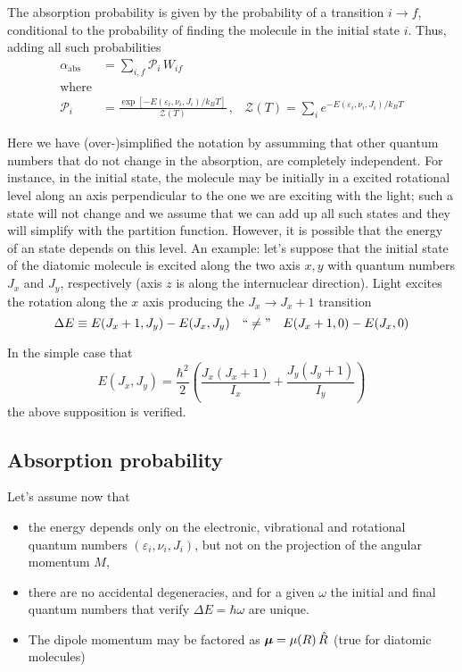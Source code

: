 The absorption probability is given by the probability of a transition $i \to f$, conditional to the probability of finding the molecule in the initial state $i$. Thus, adding all such probabilities
\begin{subequations}
  \begin{align}
    \alpha_{\text{abs}} &= \sum_{i,f} \mathcal{P}_{i}\, W_{if}
    \\ \text{where} \nonumber \\
    \mathcal{P}_{i} &= \frac{\exp{\left[-E(\varepsilon_{i},\nu_{i},J_{i})/k_{B}T \right]}}{\mathcal{Z}(T)}\,, & \mathcal{Z}(T)= \sum_{i} e^{- E(\varepsilon_{i},\nu_{i},J_{i})/k_{B}T }
  \end{align}
\end{subequations}
%
\begin{aclaracion}[Note]
  Here we have (over-)simplified the notation by assumming that other quantum numbers that do not change in the absorption, are completely independent. For instance, in the initial state, the molecule may be initially in a excited rotational level along an axis perpendicular to the one we are exciting with the light; such a state will not change and we assume that we can add up all such states and they will simplify with the partition function. However, it is possible that the energy of an state depends on this level. An example: let's suppose that the initial state of the diatomic molecule is excited along the two axis $x,y$ with quantum numbers $J_{x}$ and $J_{y}$, respectively (axis $z$ is along the internuclear direction). Light excites the rotation along the $x$ axis
  producing the $J_{x} \to J_{x} +1$ transition
  \begin{equation*}
    \Delta E \equiv E(J_{x} +1 ,J_{y}) - E(J_{x} ,J_{y}) \quad `` \neq " \quad E(J_{x} +1 ,0) - E(J_{x} ,0)
  \end{equation*}

In the simple case that 
\begin{equation*}
  E(J_{x},J_{y}) = \frac{\hbar^{2}}{2}\left( \frac{J_{x}(J_{x}+1)}{I_{x}} + \frac{J_{y}(J_{y}+1)}{I_{y}} \right)
\end{equation*}
the above supposition is verified.
\end{aclaracion}

\subsection{Absorption probability}
\label{S:absorpt-prob}

Let's assume now that
\begin{itemize}
\item the energy depends only on the electronic, vibrational and rotational quantum
  numbers $(\varepsilon_{i},\nu_{i},J_{i})$, but not on the projection of the angular
  momentum $M$,
\item there are no accidental degeneracies, and for a given $\omega$ the initial and final quantum numbers that verify $\Delta E = \hbar \omega$ are unique.
\item The dipole momentum may be factored as $\bm{\mu}= \mu(R)\, \hat{R}$ (true for diatomic molecules)
\end{itemize}

